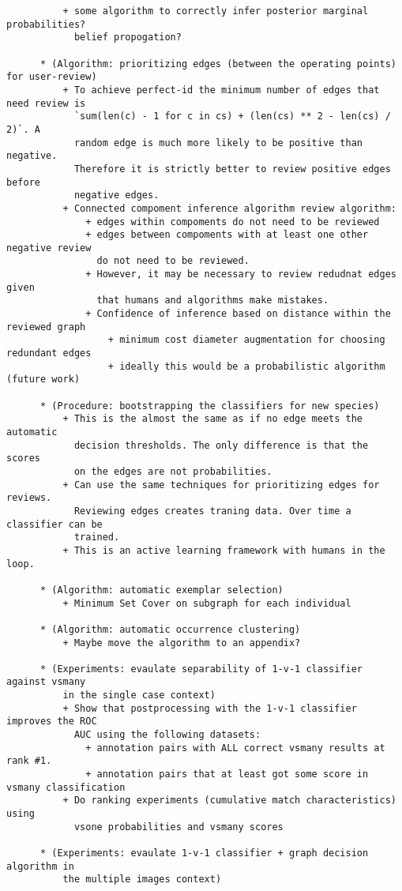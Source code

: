 \begin{verbatim}
          + some algorithm to correctly infer posterior marginal probabilities?
            belief propogation?

      * (Algorithm: prioritizing edges (between the operating points) for user-review)
          + To achieve perfect-id the minimum number of edges that need review is 
            `sum(len(c) - 1 for c in cs) + (len(cs) ** 2 - len(cs) / 2)`. A
            random edge is much more likely to be positive than negative.
            Therefore it is strictly better to review positive edges before
            negative edges. 
          + Connected compoment inference algorithm review algorithm:
              + edges within compoments do not need to be reviewed 
              + edges between compoments with at least one other negative review
                do not need to be reviewed.
              + However, it may be necessary to review redudnat edges given
                that humans and algorithms make mistakes.
              + Confidence of inference based on distance within the reviewed graph
                  + minimum cost diameter augmentation for choosing redundant edges
                  + ideally this would be a probabilistic algorithm (future work)

      * (Procedure: bootstrapping the classifiers for new species)
          + This is the almost the same as if no edge meets the automatic
            decision thresholds. The only difference is that the scores
            on the edges are not probabilities.
          + Can use the same techniques for prioritizing edges for reviews.
            Reviewing edges creates traning data. Over time a classifier can be
            trained.
          + This is an active learning framework with humans in the loop.

      * (Algorithm: automatic exemplar selection)
          + Minimum Set Cover on subgraph for each individual

      * (Algorithm: automatic occurrence clustering)
          + Maybe move the algorithm to an appendix?

      * (Experiments: evaulate separability of 1-v-1 classifier against vsmany
          in the single case context)
          + Show that postprocessing with the 1-v-1 classifier improves the ROC
            AUC using the following datasets:
              + annotation pairs with ALL correct vsmany results at rank #1.
              + annotation pairs that at least got some score in vsmany classification
          + Do ranking experiments (cumulative match characteristics) using
            vsone probabilities and vsmany scores

      * (Experiments: evaulate 1-v-1 classifier + graph decision algorithm in
          the multiple images context)


  \end{verbatim}

